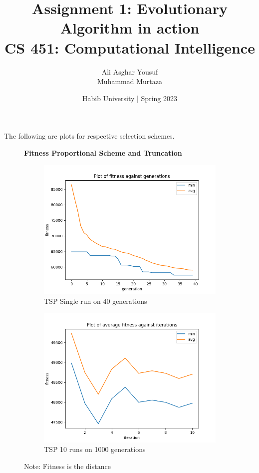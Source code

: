 \documentclass[a4paper]{exam}
\title{Assignment 1: Evolutionary Algorithm in action\\CS 451: Computational Intelligence}
\author{Ali Asghar Yousuf\\Muhammad Murtaza}  %
\date{Habib University | Spring 2023}
\begin{document}
\maketitle

\begin{questions}

  The following are plots for respective selection schemes.

  \begin{figure}[!h]
    \centering
    \textbf{Fitness Proportional Scheme and Truncation}
    \begin{subfigure}{.5\textwidth}
      \centering
      \includegraphics[width=1\linewidth]{tsp_min_avg}
      \caption{TSP Single run on 40 generations}
      \label{fig:sub1}
    \end{subfigure}%
    \begin{subfigure}{.5\textwidth}
      \centering
      \includegraphics[width=1\linewidth]{tsp_itr_avg_2}
      \caption{TSP 10 runs on 1000 generations}
      \label{fig:sub2}
    \end{subfigure}
    \caption{Note: Fitness is the distance}
    \label{fig:test}
  \end{figure}


\end{questions}
\end{document}
